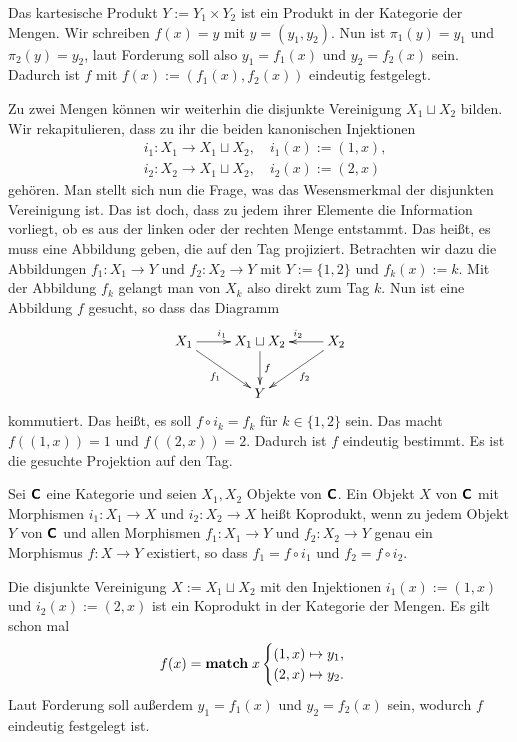 \noindent
Das kartesische Produkt $Y:=Y_1\times Y_2$ ist ein Produkt in
der Kategorie der Mengen. Wir schreiben $f(x)=y$ mit $y=(y_1,y_2)$.
Nun ist $\pi_1(y)=y_1$ und $\pi_2(y)=y_2$, laut Forderung soll also
$y_1=f_1(x)$ und $y_2=f_2(x)$ sein. Dadurch ist $f$ mit
$f(x):=(f_1(x),f_2(x))$ eindeutig festgelegt.

Zu zwei Mengen können wir weiterhin die disjunkte Vereinigung
$X_1\sqcup X_2$ bilden. Wir rekapitulieren, dass zu ihr die beiden
kanonischen Injektionen
\begin{align*}
& i_1\colon X_1\to X_1\sqcup X_2,\quad i_1(x) := (1,x),\\
& i_2\colon X_2\to X_1\sqcup X_2,\quad i_2(x) := (2,x)
\end{align*}
gehören. Man stellt sich nun die Frage, was das Wesensmerkmal
der disjunkten Vereinigung ist. Das ist doch, dass zu jedem ihrer
Elemente die Information vorliegt, ob es aus der linken oder der
rechten Menge entstammt. Das heißt, es muss eine Abbildung geben,
die auf den Tag projiziert. Betrachten wir dazu die Abbildungen
$f_1\colon X_1\to Y$ und $f_2\colon X_2\to Y$ mit $Y:=\{1,2\}$ und
$f_k(x):=k$. Mit der Abbildung $f_k$ gelangt man von $X_k$ also
direkt zum Tag $k$. Nun ist eine Abbildung $f$ gesucht, so dass das
Diagramm
\[\xymatrix{
X_1\ar[r]^{i_1}\ar[dr]_{f_1} & X_1\sqcup X_2\ar[d]^{f}
& X_2\ar[l]_{i_2}\ar[dl]^{f_2}\\
& Y &
}\]
kommutiert. Das heißt, es soll $f\circ i_k = f_k$ für $k\in\{1,2\}$ sein.
Das macht $f((1,x)) = 1$ und $f((2,x)) = 2$. Dadurch ist $f$ eindeutig
bestimmt. Es ist die gesuchte Projektion auf den Tag.

\begin{Definition}[Koprodukt]\newlinefirst
Sei $\textsf{\textbf{C}}$ eine Kategorie und seien $X_1,X_2$ Objekte von
$\textsf{\textbf{C}}$. Ein Objekt $X$ von $\textsf{\textbf{C}}$ mit Morphismen
$i_1\colon X_1\to X$ und $i_2\colon X_2\to X$
heißt Koprodukt, wenn zu jedem Objekt $Y$ von $\textsf{\textbf{C}}$ und allen
Morphismen $f_1\colon X_1\to Y$ und $f_2\colon X_2\to Y$ genau ein
Morphismus $f\colon X\to Y$ existiert, so dass $f_1 = f\circ i_1$
und $f_2 = f\circ i_2$.
\end{Definition}

\noindent
Die disjunkte Vereinigung $X:=X_1\sqcup X_2$ mit den Injektionen
$i_1(x):=(1,x)$ und $i_2(x):=(2,x)$ ist ein Koprodukt in der
Kategorie der Mengen. Es gilt schon mal
\[f(x) = \textbf{match}\; x \begin{cases}
(1,x)\mapsto y_1,\\
(2,x)\mapsto y_2.
\end{cases}\]
Laut Forderung soll außerdem $y_1 = f_1(x)$ und $y_2 = f_2(x)$ sein,
wodurch $f$ eindeutig festgelegt ist.

